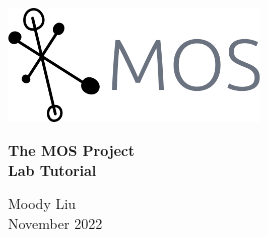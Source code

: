 \documentclass{report}
\begin{document}
\begin{titlepage}
    \vspace*{5cm}
    \begin{center}
        \includegraphics[width=0.5\textwidth]{logo/logo-no-background.png}
    \end{center}

    \vspace{1cm}

    \begin{center}
        \textbf{\huge The MOS Project}\\
        \vspace{0.5cm}
        \textbf{\large Lab Tutorial}

        \vspace{5cm}
        Moody Liu\\
        November 2022
    \end{center}
\end{titlepage}

\tableofcontents



\end{document}
